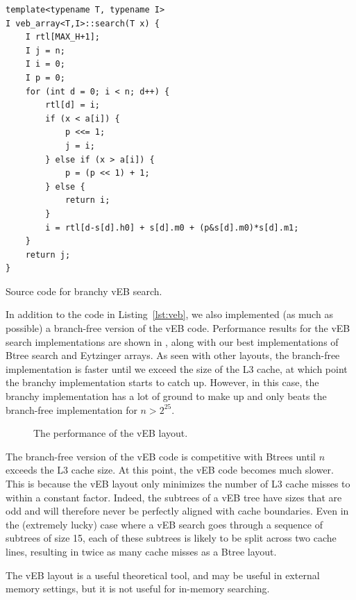 \documentclass{patmorin}
\newcommand{\lstlabel}[1]{\label{lst:#1}}
\newcommand{\lstref}[1]{Listing~\ref{lst:#1}}
\begin{document}
\begin{listing}
\begin{verbatim}
template<typename T, typename I>
I veb_array<T,I>::search(T x) {
    I rtl[MAX_H+1];
    I j = n;
    I i = 0;
    I p = 0;
    for (int d = 0; i < n; d++) {
        rtl[d] = i;
        if (x < a[i]) {
            p <<= 1;
            j = i;
        } else if (x > a[i]) {
            p = (p << 1) + 1;
        } else {
            return i;
        }
        i = rtl[d-s[d].h0] + s[d].m0 + (p&s[d].m0)*s[d].m1;
    }
    return j;
}
\end{verbatim}
\caption{Source code for branchy vEB search.}
\lstlabel{veb}
\end{listing}

In addition to the code in \lstref{veb}, we also implemented (as much as
possible) a branch-free version of the vEB code.  Performance results for
the vEB search implementations are shown in , along with our
best implementations of Btree search and Eytzinger arrays.  As seen with other
layouts, the branch-free implementation is faster until we exceed the size
of the L3 cache, at which point the branchy implementation starts to catch
up. However, in this case, the branchy implementation has a lot of ground
to make up and only beats the branch-free implementation for $n>2^{25}$.

\begin{figure}
   \caption{The performance of the vEB layout.}
\end{figure}

The branch-free version of the vEB code is competitive with Btrees
until $n$ exceeds the L3 cache size.  At this point, the vEB code becomes
much slower.  This is because the vEB layout only minimizes the number
of L3 cache misses to within a constant factor.  Indeed, the subtrees
of a vEB tree have sizes that are odd and will therefore never be
perfectly aligned with cache boundaries.  Even in the (extremely lucky)
case where a vEB search goes through a sequence of subtrees of size 15,
each of these subtrees is likely to be split across two cache lines,
resulting in twice as many cache misses as a Btree layout.

\begin{lesson}
  The vEB layout is a useful theoretical tool, and may be useful in
  external memory settings, but it is not useful for in-memory searching.
\end{lesson}
\end{document}
